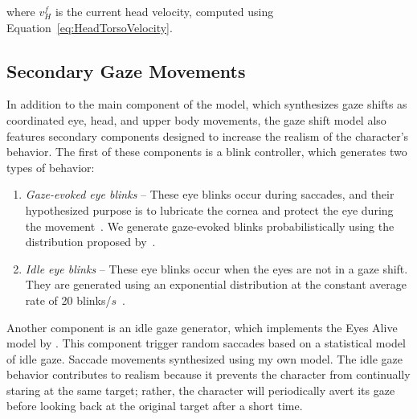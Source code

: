 where $v^f_H$ is the current head velocity, computed using Equation~\ref{eq:HeadTorsoVelocity}.

\subsection{Secondary Gaze Movements}
\label{sec:GazeShiftSecondary}

In addition to the main component of the model, which synthesizes gaze shifts as coordinated eye, head, and upper body movements, the gaze shift model also features secondary components designed to increase the realism of the character's behavior. The first of these components is a blink controller, which generates two types of behavior:

\begin{enumerate}
\item \emph{Gaze-evoked eye blinks} -- These eye blinks occur during saccades, and their hypothesized purpose is to lubricate the cornea and protect the eye during the movement~\cite{evinger1994lookleap}. We generate gaze-evoked blinks probabilistically using the distribution proposed by~\citet{peters2010animating}.
\item \emph{Idle eye blinks} -- These eye blinks occur when the eyes are not in a gaze shift. They are generated using an exponential distribution at the constant average rate of 20 blinks/$s$~\cite{bentivoglio1997blinkrate}.
\end{enumerate}

Another component is an idle gaze generator, which implements the Eyes Alive model by \citet{lee2002eyes}. This component trigger random saccades based on a statistical model of idle gaze.  Saccade movements synthesized using my own model. The idle gaze behavior contributes to realism because it prevents the character from continually staring at the same target; rather, the character will periodically avert its gaze before looking back at the original target after a short time. 